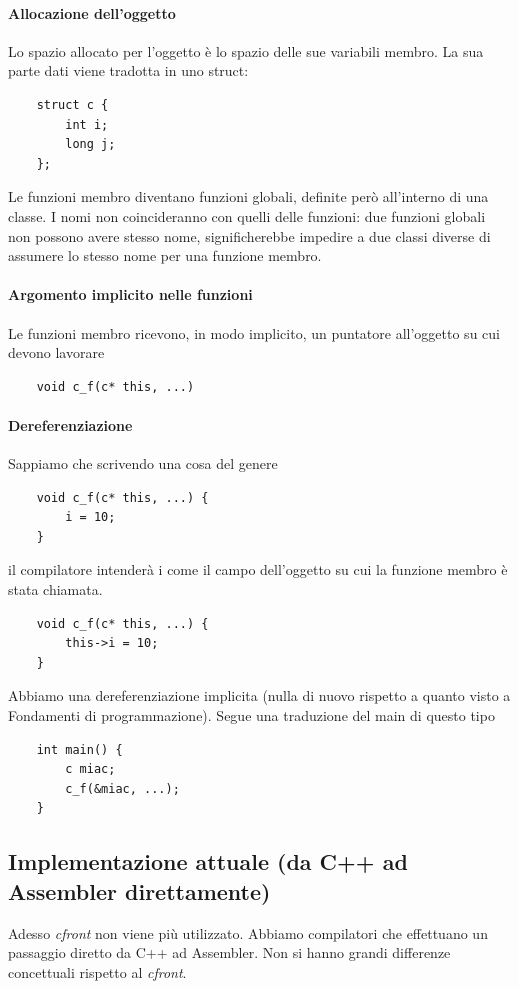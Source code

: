 \paragraph{Allocazione dell'oggetto} Lo spazio allocato per l'oggetto è lo spazio delle sue variabili membro. La sua parte dati viene tradotta in uno struct:
\begin{verbatim}
	struct c {
		int i;
		long j;
	};
\end{verbatim}
Le funzioni membro diventano funzioni globali, definite però all'interno di una classe. I nomi non coincideranno con quelli delle funzioni: due funzioni globali non possono avere stesso nome, significherebbe impedire a due classi diverse di assumere lo stesso nome per una funzione membro.
\paragraph{Argomento implicito nelle funzioni} Le funzioni membro ricevono, in modo implicito, un puntatore all'oggetto su cui devono lavorare
\begin{verbatim}
	void c_f(c* this, ...)
\end{verbatim}
\paragraph{Dereferenziazione} Sappiamo che scrivendo una cosa del genere
\begin{verbatim}
	void c_f(c* this, ...) {
		i = 10;
	}
\end{verbatim}
il compilatore intenderà i come il campo dell'oggetto su cui la funzione membro è stata chiamata. 
\begin{verbatim}
	void c_f(c* this, ...) {
		this->i = 10;
	}
\end{verbatim}
Abbiamo una dereferenziazione implicita (nulla di nuovo rispetto a quanto visto a Fondamenti di programmazione). Segue una traduzione del main di questo tipo
\begin{verbatim}
	int main() {
		c miac;
		c_f(&miac, ...);
	}
\end{verbatim}
\clearpage

\subsection{Implementazione attuale (da C++ ad Assembler direttamente)}
Adesso \emph{cfront} non viene più utilizzato. Abbiamo compilatori che effettuano un passaggio diretto da C++ ad Assembler. Non si hanno grandi differenze concettuali rispetto al \emph{cfront}. 
